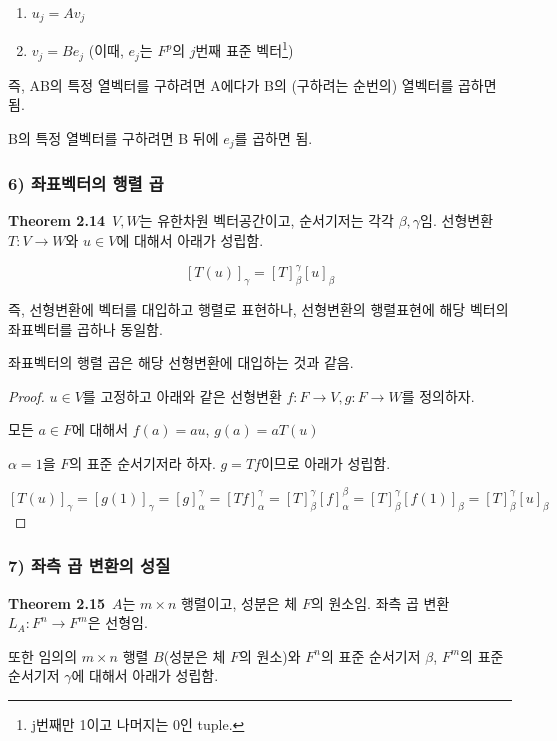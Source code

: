 \begin{enumerate}
    \item $u_j=Av_j$
    \item $v_j=Be_j$ (이때, $e_j$는 $F^p$의 $j$번째 표준 벡터\footnote{j번째만 1이고 나머지는 0인 tuple.})
\end{enumerate}

즉, AB의 특정 열벡터를 구하려면 A에다가 B의 (구하려는 순번의) 열벡터를 곱하면 됨.

B의 특정 열벡터를 구하려면 B 뒤에 $e_j$를 곱하면 됨.


\newpage


\subsubsection*{6) 좌표벡터의 행렬 곱}
\textbf{Theorem 2.14}\, $V,W$는 유한차원 벡터공간이고, 순서기저는 각각 $\beta, \gamma$임. 선형변환 $T:V \rightarrow W$와 $u \in V$에 대해서 아래가 성립함.

\[
[T(u)]_{\gamma}=[T]_{\beta}^{\gamma}[u]_{\beta}
\]

즉, 선형변환에 벡터를 대입하고 행렬로 표현하나, 선형변환의 행렬표현에 해당 벡터의 좌표벡터를 곱하나 동일함.

좌표벡터의 행렬 곱은 해당 선형변환에 대입하는 것과 같음.

\begin{proof}
$u \in V$를 고정하고 아래와 같은 선형변환 $f:F \rightarrow V,g:F \rightarrow W$를 정의하자.

\begin{center}
모든 $a \in F$에 대해서 $f(a)=au$, $g(a)=aT(u)$
\end{center}

$\alpha={1}$을 $F$의 표준 순서기저라 하자. $g =Tf$이므로 아래가 성립함.

\[
[T(u)]_{\gamma}=[g(1)]_{\gamma}=[g]_{\alpha}^{\gamma}=[Tf]_{\alpha}^{\gamma}=[T]_{\beta}^{\gamma}[f]_{\alpha}^{\beta}=[T]_{\beta}^{\gamma}[f(1)]_{\beta}=[T]_{\beta}^{\gamma}[u]_{\beta}
\]

\end{proof}

\subsubsection*{7) 좌측 곱 변환의 성질}
\textbf{Theorem 2.15}\, $A$는 $m \times n$ 행렬이고, 성분은 체 $F$의 원소임. 좌측 곱 변환 $L_A:F^n \rightarrow F^m$은 선형임.

또한 임의의 $m \times n$ 행렬 $B$(성분은 체 $F$의 원소)와 $F^n$의 표준 순서기저 $\beta$, $F^m$의 표준 순서기저 $\gamma$에 대해서 아래가 성립함.

